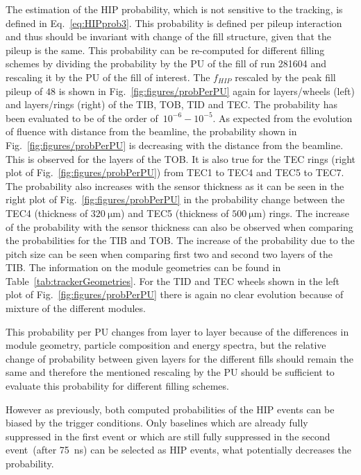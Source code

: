 The estimation of the HIP probability, which is not sensitive to the tracking, is defined in Eq.~\ref{eq:HIPprob3}. This probability is defined per pileup interaction and thus should be invariant with change of the fill structure, given that the pileup is the same. This probability can be re-computed for different filling schemes by dividing the probability by the PU of the fill of run 281604 and rescaling it by the PU of the fill of interest. The $f_{HIP}$ rescaled by the peak fill pileup of $48$ is shown in Fig.~\ref{fig:figures/probPerPU} again for layers/wheels (left) and layers/rings (right) of the TIB, TOB, TID and TEC. The probability has been evaluated to be of the order of~$10^{-6}-10^{-5}$.  As expected from the evolution of fluence with distance from the beamline, the probability shown in Fig.~\ref{fig:figures/probPerPU} is decreasing with the distance from the beamline. This is observed for the layers of the TOB. It is also true for the TEC rings (right plot of Fig.~\ref{fig:figures/probPerPU}) from TEC1 to TEC4 and TEC5 to TEC7. The probability also increases with the sensor thickness as it can be seen in the right plot of Fig.~\ref{fig:figures/probPerPU} in the probability change between the TEC4 (thickness of $320~\mathrm{\mu m}$) and TEC5 (thickness of $500~\mathrm{\mu m}$) rings.  The increase of the probability with the sensor thickness can also be observed when comparing the probabilities for the TIB and TOB.  The increase of the probability due to the pitch size can be seen when comparing first two and second two layers of the TIB. The information on the module geometries can be found in Table~\ref{tab:trackerGeometries}.  For the TID and TEC wheels shown in the left plot of Fig.~\ref{fig:figures/probPerPU} there is again no clear evolution because of mixture of the different modules. 

This probability per PU changes from layer to layer because of the differences in module geometry, particle composition and energy spectra, but the relative change of probability between given layers for the different fills should remain the same and therefore the mentioned rescaling by the PU should be sufficient to evaluate this probability for different filling schemes.


However as previously, both computed probabilities of the HIP events can be biased by the trigger conditions. Only baselines which are already fully suppressed in the first event or which are still fully suppressed in the second event~(after 75~ns) can be selected as HIP events, what potentially decreases the probability.

